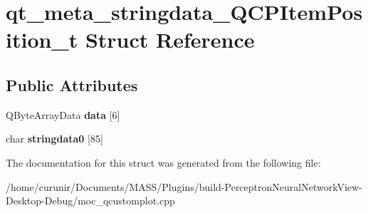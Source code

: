 \hypertarget{structqt__meta__stringdata___q_c_p_item_position__t}{}\section{qt\+\_\+meta\+\_\+stringdata\+\_\+\+Q\+C\+P\+Item\+Position\+\_\+t Struct Reference}
\label{structqt__meta__stringdata___q_c_p_item_position__t}
\subsection*{Public Attributes}
\begin{DoxyCompactItemize}
\item 
Q\+Byte\+Array\+Data {\bfseries data} \mbox{[}6\mbox{]}\hypertarget{structqt__meta__stringdata___q_c_p_item_position__t_a7efdce6b4c431297ac7218626630d15f}{}\label{structqt__meta__stringdata___q_c_p_item_position__t_a7efdce6b4c431297ac7218626630d15f}

\item 
char {\bfseries stringdata0} \mbox{[}85\mbox{]}\hypertarget{structqt__meta__stringdata___q_c_p_item_position__t_a0321410c49080a232c195e07eac0ea1a}{}\label{structqt__meta__stringdata___q_c_p_item_position__t_a0321410c49080a232c195e07eac0ea1a}

\end{DoxyCompactItemize}


The documentation for this struct was generated from the following file\+:\begin{DoxyCompactItemize}
\item 
/home/curunir/\+Documents/\+M\+A\+S\+S/\+Plugins/build-\/\+Perceptron\+Neural\+Network\+View-\/\+Desktop-\/\+Debug/moc\+\_\+qcustomplot.\+cpp\end{DoxyCompactItemize}
